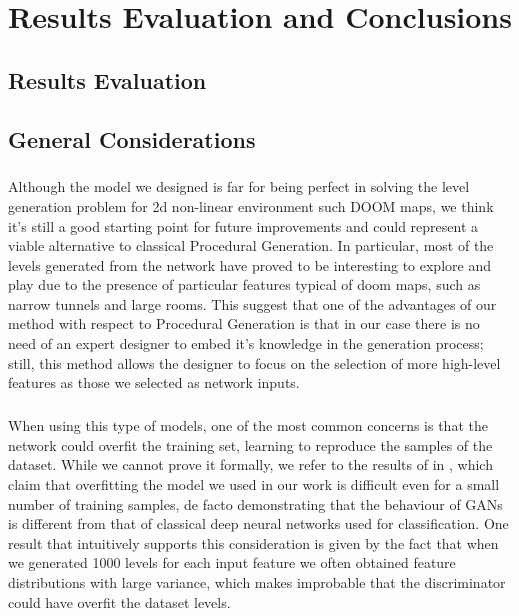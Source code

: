 \chapter{Results Evaluation and Conclusions}
\section{Results Evaluation}





\section{General Considerations}
\label{sec:considerations}
\paragraph{} Although the model we designed is far for being perfect in solving the level generation problem for 2d non-linear environment such DOOM maps, we think it's still a good starting point for future improvements and could represent a viable alternative to classical Procedural Generation. In particular, most of the levels generated from the network have proved to be interesting to explore and play due to the presence of particular features typical of doom maps, such as narrow tunnels and large rooms. This suggest that one of the advantages of our method with respect to Procedural Generation is that in our case there is no need of an expert designer to embed it's knowledge in the generation process; still, this method allows the designer to focus on the selection of more high-level features as those we selected as network inputs. 

\paragraph{} When using this type of models, one of the most common concerns is that the network could overfit the training set, learning to reproduce the samples of the dataset. While we cannot prove it formally, we refer to the results of \citeauthor{empiricalevaluation} in \cite[Appendix~C]{empiricalevaluation}, which claim that overfitting the model we used in our work is difficult even for a small number of training samples, de facto demonstrating that the behaviour of GANs is different from that of classical deep neural networks used for classification. One result that intuitively supports this consideration is given by the fact that when we generated 1000 levels for each input feature we often obtained feature distributions with large variance, which makes improbable that the discriminator could have overfit the dataset levels.



